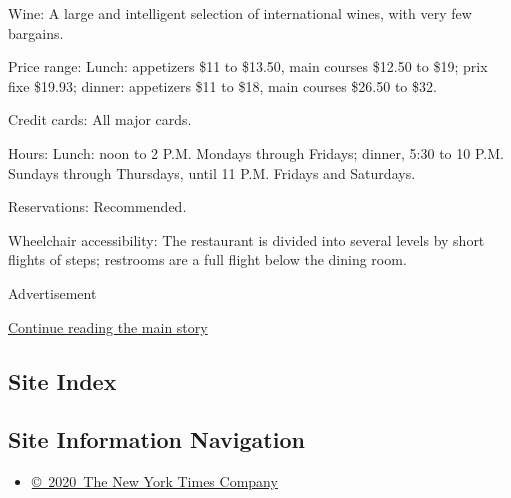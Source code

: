 Wine: A large and intelligent selection of international wines, with
very few bargains.

Price range: Lunch: appetizers \$11 to \$13.50, main courses \$12.50 to
\$19; prix fixe \$19.93; dinner: appetizers \$11 to \$18, main courses
\$26.50 to \$32.

Credit cards: All major cards.

Hours: Lunch: noon to 2 P.M. Mondays through Fridays; dinner, 5:30 to 10
P.M. Sundays through Thursdays, until 11 P.M. Fridays and Saturdays.

Reservations: Recommended.

Wheelchair accessibility: The restaurant is divided into several levels
by short flights of steps; restrooms are a full flight below the dining
room.

Advertisement

\protect\hyperlink{after-bottom}{Continue reading the main story}

\hypertarget{site-index}{%
\subsection{Site Index}\label{site-index}}

\hypertarget{site-information-navigation}{%
\subsection{Site Information
Navigation}\label{site-information-navigation}}

\begin{itemize}
\tightlist
\item
  \href{https://help.nytimes3xbfgragh.onion/hc/en-us/articles/115014792127-Copyright-notice}{©~2020~The
  New York Times Company}
\end{itemize}

